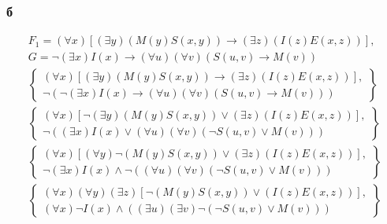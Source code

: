 \documentclass[12pt]{article}
\begin{document}
\subsubsection{б}
\begin{gather*}
  F_1 = \left(\forall x\right)\left[\left(\exists y\right)\left(M(y)S(x,y)\right) \rightarrow \left(\exists z\right)\left(I(z)E(x,z)\right)\right], \\
  G = \neg \left(\exists x\right)I(x)\rightarrow \left(\forall u\right)\left(\forall v\right)\left(S(u, v) \rightarrow M(v)\right) \\
  \left\{
    \begin{array}{c}
  \left(\forall x\right)\left[\left(\exists y\right)\left(M(y)S(x,y)\right) \rightarrow \left(\exists z\right)\left(I(z)E(x,z)\right)\right], \\
  \neg \left(\neg \left(\exists x\right)I(x)\rightarrow \left(\forall u\right)\left(\forall v\right)\left(S(u, v) \rightarrow M(v)\right)\right)
    \end{array}
  \right\} \\
  \left\{
    \begin{array}{c}
  \left(\forall x\right)\left[\neg\left(\exists y\right)\left(M(y)S(x,y)\right) \vee \left(\exists z\right)\left(I(z)E(x,z)\right)\right], \\
    \neg \left(\left(\exists x\right)I(x)\vee \left(\forall u\right)\left(\forall v\right)\left(\neg S(u, v) \vee M(v)\right)\right)
    \end{array}
  \right\} \\
  \left\{
    \begin{array}{c}
      \left(\forall x\right)\left[\left(\forall y\right)\neg\left(M(y)S(x,y)\right) \vee \left(\exists z\right)\left(I(z)E(x,z)\right)\right], \\
    \neg\left(\exists x\right)I(x)\wedge \neg\left(\left(\forall u\right)\left(\forall v\right)\left(\neg S(u, v) \vee M(v)\right)\right)
    \end{array}
  \right\} \\
  \left\{
    \begin{array}{c}
      \left(\forall x\right)\left(\forall y\right)\left(\exists z\right)\left[\neg\left(M(y)S(x,y)\right) \vee \left(I(z)E(x,z)\right)\right], \\
      \left(\forall x\right)\neg I(x)\wedge \left(\left(\exists u\right)\left(\exists v\right)\neg\left(\neg S(u, v) \vee M(v)\right)\right)
    \end{array}
  \right\} \\

\end{gather*}
\end{document}
